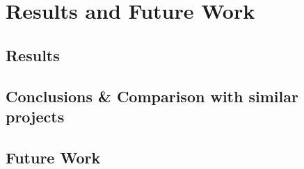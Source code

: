 \section{Results and Future Work}

\subsection{Results}

\subsection{Conclusions \& Comparison with similar projects}

\subsection{Future Work}